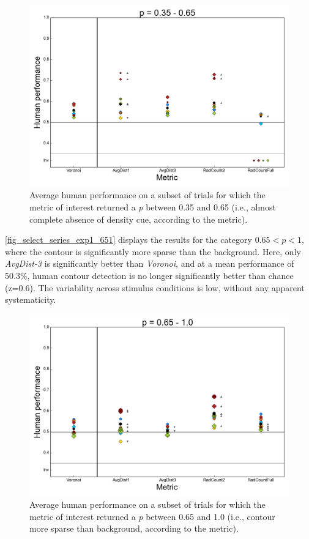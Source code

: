 \documentclass[12pt]{article}
\begin{document}
\begin{figure}
\includegraphics{Figures/FIG_select_series_exp1_3565.png}
\caption{Average human performance on a subset of trials for which the metric of interest returned a \emph{p} between 0.35 and 0.65 (i.e., almost complete absence of density cue, according to the metric).}
\label{fig_select_series_exp1_3565}
\end{figure}

\autoref{fig_select_series_exp1_651} displays the results for the category $0.65 < p < 1$, where the contour is significantly more sparse than the background. Here, only \emph{AvgDist-3} is significantly better than \emph{Voronoi}, and at a mean performance of 50.3\%, human contour detection is no longer significantly better than chance (z=0.6). The variability across stimulus conditions is low, without any apparent systematicity.\\

\begin{figure}
\includegraphics{Figures/FIG_select_series_exp1_651.png}
\caption{Average human performance on a subset of trials for which the metric of interest returned a \emph{p} between 0.65 and 1.0 (i.e., contour more sparse than background, according to the metric).}
\label{fig_select_series_exp1_651}
\end{figure}
\end{document}

